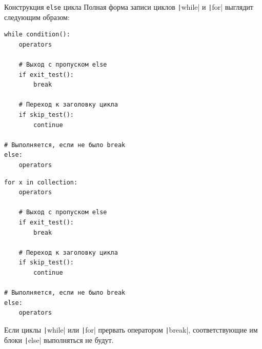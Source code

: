 \documentclass[aspectratio=169]{beamer}	%
\begin{document}
%		
%
%


\begin{frame}[fragile]{Конструкция \texttt{else} цикла}
\scriptsize
Полная форма записи циклов \texttt|while| и \texttt|for| выглядит следующим образом:

\begin{multicols}{2}

\begin{verbatim}
while condition():
    operators

    # Выход с пропуском else
    if exit_test():
        break 

    # Переход к заголовку цикла
    if skip_test():
        continue

# Выполняется, если не было break
else:
    operators
\end{verbatim}

\columnbreak

\begin{verbatim}
for x in collection:
    operators

    # Выход с пропуском else
    if exit_test():
        break 

    # Переход к заголовку цикла
    if skip_test():
        continue

# Выполняется, если не было break
else:
    operators
\end{verbatim}

\end{multicols}	

Если циклы \texttt|while| или \texttt|for| прервать оператором \texttt|break|, соответствующие им блоки \texttt|else| выполняться не будут.
\vfill
\end{frame}
\end{document}
